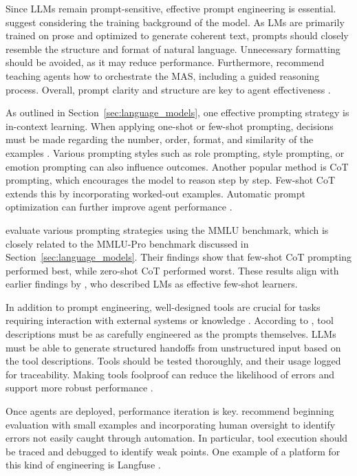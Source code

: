 \documentclass[a4paper,oneside,bibliography=totoc]{scrbook}
\begin{document}
Since \acp{LLM} remain prompt-sensitive, effective prompt engineering is essential. \citet{Anthropic2024} suggest considering the training background of the model. As \acp{LM} are primarily trained on prose and optimized to generate coherent text, prompts should closely resemble the structure and format of natural language. Unnecessary formatting should be avoided, as it may reduce performance. Furthermore, \citet{Hadfield2025} recommend teaching agents how to orchestrate the \ac{MAS}, including a guided reasoning process. Overall, prompt clarity and structure are key to agent effectiveness \cite{OpenAI2025}.

As outlined in Section~\ref{sec:language_models}, one effective prompting strategy is in-context learning. When applying one-shot or few-shot prompting, decisions must be made regarding the number, order, format, and similarity of the examples \cite{Schulhoff2025}. Various prompting styles such as role prompting, style prompting, or emotion prompting can also influence outcomes. Another popular method is \ac{CoT} prompting, which encourages the model to reason step by step. Few-shot \ac{CoT} extends this by incorporating worked-out examples. Automatic prompt optimization can further improve agent performance \cite{Schulhoff2025}.

\citet{Schulhoff2025} evaluate various prompting strategies using the MMLU benchmark, which is closely related to the MMLU-Pro benchmark discussed in Section~\ref{sec:language_models}. Their findings show that few-shot \ac{CoT} prompting performed best, while zero-shot \ac{CoT} performed worst. These results align with earlier findings by \citet{Brown2020}, who described \acp{LM} as effective few-shot learners.

In addition to prompt engineering, well-designed tools are crucial for tasks requiring interaction with external systems or knowledge \cite{OpenAI2025}. According to \citet{Anthropic2024}, tool descriptions must be as carefully engineered as the prompts themselves. \acp{LLM} must be able to generate structured handoffs from unstructured input based on the tool descriptions. Tools should be tested thoroughly, and their usage logged for traceability. Making tools foolproof can reduce the likelihood of errors and support more robust performance \cite{Anthropic2024}.

Once agents are deployed, performance iteration is key. \citet{Hadfield2025} recommend beginning evaluation with small examples and incorporating human oversight to identify errors not easily caught through automation. In particular, tool execution should be traced and debugged to identify weak points. One example of a platform for this kind of engineering is Langfuse \cite{LGFT2025}.
\end{document}
